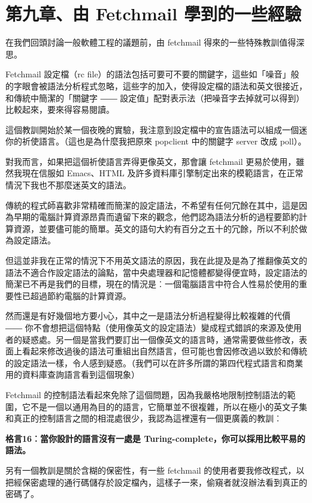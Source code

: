 \documentclass[12pt, a5paper]{book}
\begin{document}
\section{第九章、由 Fetchmail
學到的一些經驗}\label{ux7b2cux4e5dux7ae0ux7531-fetchmail-ux5b78ux5230ux7684ux4e00ux4e9bux7d93ux9a57}

在我們回頭討論一般軟體工程的議題前，由 fetchmail
得來的一些特殊教訓值得深思。

Fetchmail 設定檔（rc
file）的語法包括可要可不要的關鍵字，這些如「噪音」般的字眼會被語法分析程式忽略，這些字的加入，使得設定檔的語法和英文很接近，和傳統中簡潔的「關鍵字
――
設定值」配對表示法（把噪音字去掉就可以得到）比較起來，要來得容易閱讀。

這個教訓開始於某一個夜晚的實驗，我注意到設定檔中的宣告語法可以組成一個迷你的祈使語言。（這也是為什麼我把原來
popclient 中的關鍵字 server 改成 poll）。

對我而言，如果把這個祈使語言弄得更像英文，那會讓 fetchmail
更易於使用，雖然我現在信服如 Emacs、HTML
及許多資料庫引擎制定出來的模範語言，在正常情況下我也不那麼迷英文的語法。

傳統的程式師喜歡非常精確而簡潔的設定語法，不希望有任何冗餘在其中，這是因為早期的電腦計算資源昂貴而遺留下來的觀念，他們認為語法分析的過程要節約計算資源，並要儘可能的簡單。英文的語句大約有百分之五十的冗餘，所以不利於做為設定語法。

但這並非我在正常的情況下不用英文語法的原因，我在此提及是為了推翻像英文的語法不適合作設定語法的論點，當中央處理器和記憶體都變得便宜時，設定語法的簡潔已不再是我們的目標，現在的情況是︰一個電腦語言中符合人性易於使用的重要性已超過節約電腦的計算資源。

然而還是有好幾個地方要小心，其中之一是語法分析過程變得比較複雜的代價 ――
你不會想把這個特點（使用像英文的設定語法）變成程式錯誤的來源及使用者的疑惑處。另一個是當我們要訂出一個像英文的語言時，通常需要做些修改，表面上看起來修改過後的語法可重組出自然語言，但可能也會因修改過以致於和傳統的設定語法一樣，令人感到疑惑。（我們可以在許多所謂的第四代程式語言和商業用的資料庫查詢語言看到這個現象）

Fetchmail
的控制語法看起來免除了這個問題，因為我嚴格地限制控制語法的範圍，它不是一個以通用為目的的語言，它簡單並不很複雜，所以在極小的英文子集和真正的控制語言之間的相混處很少，我認為這裡還有一個更廣義的教訓︰

\textbf{格言16︰當你設計的語言沒有一處是
Turing-complete，你可以採用比較平易的語法。}

另有一個教訓是關於含糊的保密性，有一些 fetchmail
的使用者要我修改程式，以把經保密處理的通行碼儲存於設定檔內，這樣子一來，偷窺者就沒辦法看到真正的密碼了。
\end{document}
